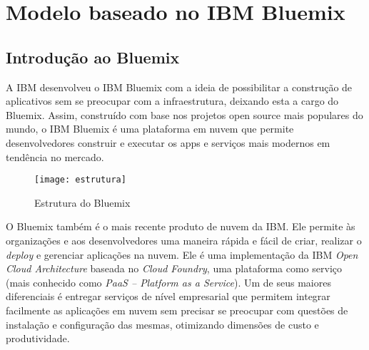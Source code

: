 




\section{Modelo baseado no IBM Bluemix}

\subsection{Introdução ao Bluemix}

A IBM desenvolveu o IBM Bluemix com a ideia de possibilitar a construção de aplicativos sem se preocupar com a infraestrutura, deixando esta a cargo do Bluemix. Assim, construído com base nos projetos open source mais populares do mundo, o IBM Bluemix é uma plataforma em nuvem que permite desenvolvedores construir e executar os apps e serviços mais modernos em tendência no mercado.

\begin{figure}[!htb]
  \centering
  \texttt{[image: estrutura]}
  \caption{Estrutura do Bluemix}
  \label{Rotulo}
\end{figure}

O Bluemix também é o mais recente produto de nuvem da IBM. Ele permite às organizações e aos desenvolvedores uma maneira rápida e fácil de criar, realizar o \textit{deploy} e gerenciar aplicações na nuvem. Ele é uma implementação da IBM \textit{Open Cloud Architecture} baseada no \textit{Cloud Foundry}, uma plataforma como serviço (mais conhecido como \textit{PaaS – Platform as a Service}). Um de seus maiores diferenciais é entregar serviços de nível empresarial que permitem integrar facilmente as aplicações em nuvem sem precisar se preocupar com questões de instalação e configuração das mesmas, otimizando dimensões de custo e produtividade.

